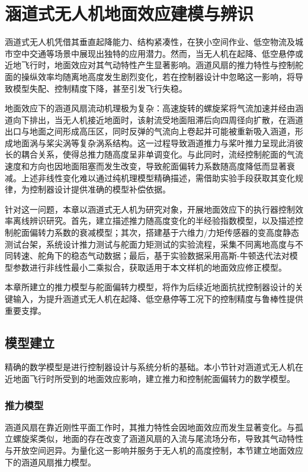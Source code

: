 \chapter{涵道式无人机地面效应建模与辨识}
涵道式无人机凭借其垂直起降能力、结构紧凑性，在狭小空间作业、低空物流及城市空中交通等场景中展现出独特的应用潜力。然而，当无人机在起降、低空悬停或近地飞行时，地面效应对其气动特性产生显著影响。涵道风扇的推力特性与控制舵面的操纵效率均随离地高度发生剧烈变化，若在控制器设计中忽略这一影响，将导致模型失配、控制精度下降，甚至引发飞行失稳。

地面效应下的涵道风扇流动机理极为复杂：高速旋转的螺旋桨将气流加速并经由涵道向下排出，当无人机接近地面时，该射流受地面阻滞后向四周径向扩散，在涵道出口与地面之间形成高压区，同时反弹的气流向上卷起并可能被重新吸入涵道，形成地面涡与桨尖涡等复杂涡系结构。这一过程导致涵道推力与桨叶推力呈现此消彼长的耦合关系，使得总推力随高度呈非单调变化。与此同时，流经控制舵面的气流速度和方向也因地面阻塞而发生改变，导致舵面偏转力系数随高度降低而显著衰减。上述非线性变化难以通过纯机理模型精确描述，需借助实验手段获取其变化规律，为控制器设计提供准确的模型补偿依据。

针对这一问题，本章以涵道式无人机为研究对象，开展地面效应下的执行器控制效率离线辨识研究。首先，建立描述推力随高度变化的半经验指数模型，以及描述控制舵面偏转力系数的衰减模型；其次，搭建基于六维力/力矩传感器的变高度静态测试台架，系统设计推力测试与舵面力矩测试的实验流程，采集不同离地高度与不同转速、舵角下的稳态气动数据；最后，基于实验数据采用高斯-牛顿迭代法对模型参数进行非线性最小二乘拟合，获取适用于本文样机的地面效应修正模型。

本章所建立的推力模型与舵面偏转力模型，将作为后续近地面抗扰控制器设计的关键输入，为提升涵道式无人机在起降、低空悬停等工况下的控制精度与鲁棒性提供重要支撑。

\section{模型建立} %
\label{sec:model_identification}
精确的数学模型是进行控制器设计与系统分析的基础。本小节针对涵道式无人机在近地面飞行时所受到的地面效应影响，建立推力和控制舵面偏转力的数学模型。

\subsection{推力模型}
\label{subsec:thrust_model}

涵道风扇在靠近刚性平面工作时，其推力特性会因地面效应而发生显著变化。与孤立螺旋桨类似，地面的存在改变了涵道风扇的入流与尾流场分布，导致其气动特性与开放空间迥异\cite{matuz2021ground}。为量化这一影响并服务于无人机的高度控制，本节建立地面效应下的涵道风扇推力模型。

